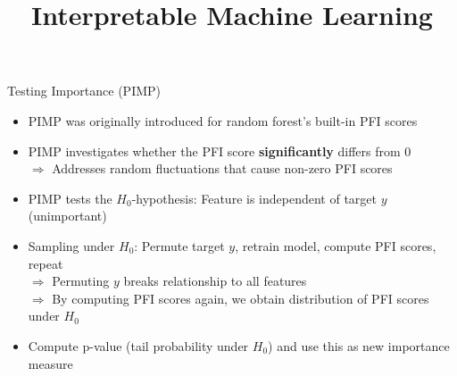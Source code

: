 \documentclass[11pt,compress,t,notes=noshow, aspectratio=169, xcolor=table]{beamer}
\title{Interpretable Machine Learning}
\date{}
\begin{document}
	\newcommand{\titlefigure}{figure_man/pimp}
    \newcommand{\learninggoals}{
    	\item Understand PIMP and its motivation
            \item Address multiple testing in feature importance}
	
	
	

	


\begin{frame}{Testing Importance (PIMP) }

\begin{itemize}[<+->]
  \item PIMP was originally introduced for random forest's built-in PFI scores
  \item PIMP investigates whether the PFI score \textbf{significantly} differs from 0\\
  $\Rightarrow$ Addresses random fluctuations that cause non-zero PFI scores
  \item PIMP tests the $H_0$-hypothesis: Feature is independent of target $y$ (unimportant)
  \item Sampling under $H_0$: Permute target $y$, retrain model, compute PFI scores, repeat\\
  $\Rightarrow$ Permuting $y$ breaks relationship to all features\\
  $\Rightarrow$ By computing PFI scores again, we obtain distribution of PFI scores under $H_0$
  \item %
  Compute p-value (tail probability under $H_0$) and use this as new importance measure
\end{itemize}


\end{frame}
\end{document}
